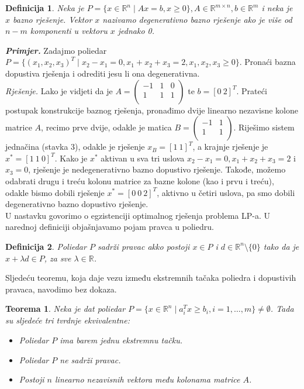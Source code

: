 \documentclass[a4paper, utf8, 11pt, colorlinks]{book}
\newtheorem{definition}{Definicija}
\newtheorem{thm}{Teorema}
\begin{document}
\begin{definition}
      Neka je $P = \{ x \in \mathbb{R}^n \mid A x = b, x \geq 0\}, A \in \mathbb{R}^{m \times n}, b \in \mathbb{R}^m$    i neka je $x$ bazno rješenje. Vektor $x$ nazivamo degenerativno bazno rješenje ako je više od $n-m$ komponenti u vektoru $x$   jednako 0.
\end{definition}
\emph{\textbf{Primjer.}} Zadajmo poliedar $P= \{ (x_1,x_2,x_3)^T \mid x_2 - x_1 = 0, x_1 + x_2 +   x_3 = 2, x_1,x_2,x_3 \geq 0 \}$.  Pronaći bazna dopustiva rješenja i odrediti jesu li ona degenerativna. \\

\emph{Rješenje.} Lako je vidjeti da je  
$A=\left (\begin{array}{ccc}
   -1  &  1 & 0  \\
   1  &  1 & 1 \\
\end{array} \right )$ te $b = [0\ 2]^T$. Prateći postupak konstrukcije baznog rješenja, pronađimo dvije linearno nezavisne kolone matrice $A$, recimo prve dvije, odakle je matica $B=\left (\begin{array}{cc}
   -1  & 1    \\
   1  &  1   \\
\end{array} \right ) .$ Riješimo sistem jednačina (stavka 3), odakle je rješenje $x_B = [1\ 1]^T$, a krajnje rješenje je $x^* = [1\ 1\ 0]^T$. Kako je 
$x^*$ aktivan u sva tri uslova $x_2 - x_1 = 0, x_1 + x_2 +  x_3 = 2$ i $x_3 = 0$, rješenje je nedegenerativno bazno dopustivo rješenje.  Takođe, možemo odabrati drugu i treću kolonu matrice za bazne kolone (kao i prvu i treću), odakle bismo dobili rješenje $x^* = [0\ 0\ 2]^T$, aktivno u četiri uslova, pa smo dobili degenerativno bazno dopustivo rješenje. \\


U nastavku govorimo o egzistenciji optimalnog rješenja problema LP-a. U narednoj definiciji objašnjavamo pojam pravca u poliedru.

\begin{definition}
      Poliedar $P$ sadrži pravac akko postoji $x \in P$ i $d \in \mathbb{R}^n \setminus \{0\}$ tako da je $x + \lambda d \in P$, za sve $\lambda \in \mathbb{R}$. 
\end{definition}

Sljedeću teoremu, koja daje vezu između ekstremnih tačaka poliedra i dopustivih pravaca, navodimo bez dokaza.

\begin{thm}
   Neka je dat poliedar $P=\{ x \in \mathbb{R}^n  \mid a_i^T x \geq b_i, i=1,\ldots,m\} \neq \emptyset$. Tada su sljedeće tri tvrdnje ekvivalentne:
   \begin{itemize}
       \item  Poliedar $P$ ima barem jednu ekstremnu tačku.
       \item Poliedar $P$ ne sadrži pravac.
       \item Postoji $n$ linearno nezavisnih vektora  među kolonama matrice $A$. %
   \end{itemize}
\end{thm}
\end{document}

